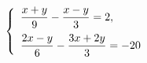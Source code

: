 \begin{ex}
	\begin{condition}
		\( \left\{
		\begin{array}{l}
			\dfrac{x+y}{9}-\dfrac{x-y}{3}=2,\vspace{0,2cm}\\
			\dfrac{2x-y}{6}-\dfrac{3x+2y}{3}=-20
		\end{array}
		\right. \)
	\end{condition}
\end{ex}